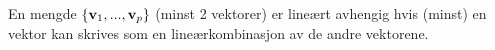 En mengde $\{ \mathbf{v}_1, ..., \mathbf{v}_p \}$ (minst 2 vektorer)
er lineært avhengig hvis (minst) en vektor kan skrives som
en lineærkombinasjon av de andre vektorene.

